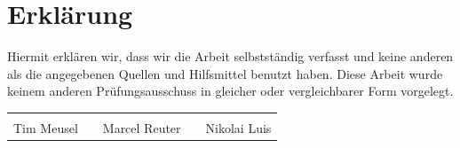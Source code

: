 

\chapter{Erklärung}
Hiermit erklären wir, dass wir die Arbeit selbstständig verfasst und keine
anderen als die angegebenen Quellen und Hilfsmittel benutzt haben. Diese Arbeit
wurde keinem anderen Prüfungsausschuss in gleicher oder vergleichbarer Form
vorgelegt.

\vfill
{\centering
\renewcommand{\arraystretch}{0.9}
\begin{tabular}{p{}p{}p{}p{}p{}}
  \dotfill                    & & \dotfill                      & & \dotfill \\
  \centering\footnotesize{Tim Meusel}& & \centering\footnotesize{Marcel Reuter}& & \centering\footnotesize{Nikolai Luis}%
\end{tabular}
}

